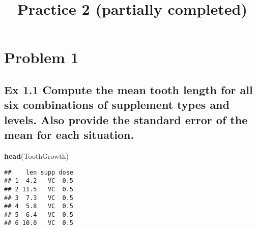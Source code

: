 \documentclass[
]{article}
\title{Practice 2 (partially completed)}
\author{}
\date{\vspace{-2.5em}}
\newenvironment{Shaded}{\begin{snugshade}}{\end{snugshade}}
\newcommand{\KeywordTok}[1]{\textcolor[rgb]{0.13,0.29,0.53}{\textbf{#1}}}
\newcommand{\NormalTok}[1]{#1}
\begin{document}
\maketitle

\hypertarget{problem-1}{%
\section{Problem 1}\label{problem-1}}

\hypertarget{ex-1.1-compute-the-mean-tooth-length-for-all-six-combinations-of-supplement-types-and-levels.-also-provide-the-standard-error-of-the-mean-for-each-situation.}{%
\subsection{Ex 1.1 Compute the mean tooth length for all six
combinations of supplement types and levels. Also provide the standard
error of the mean for each
situation.}\label{ex-1.1-compute-the-mean-tooth-length-for-all-six-combinations-of-supplement-types-and-levels.-also-provide-the-standard-error-of-the-mean-for-each-situation.}}

\begin{Shaded}
\begin{Highlighting}[]
\KeywordTok{head}\NormalTok{(ToothGrowth)}
\end{Highlighting}
\end{Shaded}

\begin{verbatim}
##    len supp dose
## 1  4.2   VC  0.5
## 2 11.5   VC  0.5
## 3  7.3   VC  0.5
## 4  5.8   VC  0.5
## 5  6.4   VC  0.5
## 6 10.0   VC  0.5
\end{verbatim}
\end{document}
